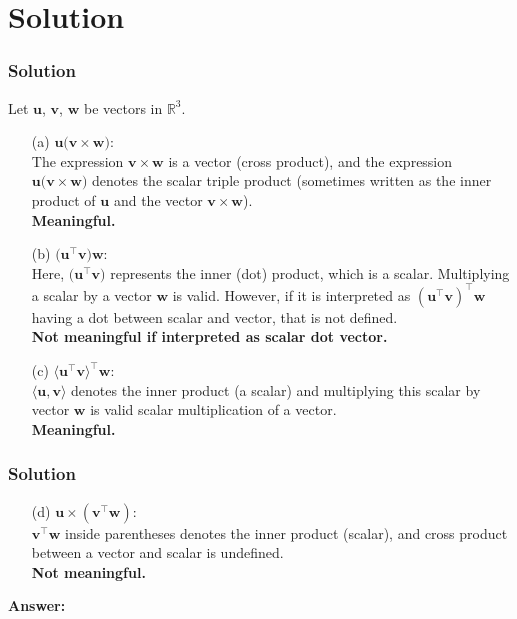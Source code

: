 \documentclass{beamer}
\theoremstyle{remark}
\numberwithin{equation}{section}
\begin{document}
\section{Solution}
\begin{frame}[fragile]
    \frametitle{Solution}
Let $\mathbf{u}$, $\mathbf{v}$, $\mathbf{w}$ be vectors in $\mathbb{R}^3$.

\begin{itemize}
    \item[(a)] $\mathbf{u} \big(\mathbf{v} \times \mathbf{w}\big)$: \\
    The expression $\mathbf{v} \times \mathbf{w}$ is a vector (cross product), and the expression $\mathbf{u} \big(\mathbf{v} \times \mathbf{w}\big)$ denotes the scalar triple product (sometimes written as the inner product of $\mathbf{u}$ and the vector $\mathbf{v} \times \mathbf{w}$).\\
    \textbf{Meaningful.}
    
    \item[(b)] $\big(\mathbf{u} ^\top\mathbf{v}\big) \mathbf{w}$: \\
    Here, $\big(\mathbf{u}^\top \mathbf{v}\big)$ represents the inner (dot) product, which is a scalar. Multiplying a scalar by a vector $\mathbf{w}$ is valid. However, if it is interpreted as $(\mathbf{u}^\top  \mathbf{v}) ^\top \mathbf{w}$ having a dot between scalar and vector, that is not defined.\\
    \textbf{Not meaningful if interpreted as scalar dot vector.}
    
    \item[(c)] $\langle \mathbf{u}^\top  \mathbf{v} \rangle^\top  \mathbf{w}$: \\
    $\langle \mathbf{u}, \mathbf{v} \rangle$ denotes the inner product (a scalar) and multiplying this scalar by vector $\mathbf{w}$ is valid scalar multiplication of a vector.\\
    \textbf{Meaningful.} 
    
\end{itemize}



\end{frame}
\begin{frame}[fragile]
    \frametitle{Solution}
\begin{itemize}
    
    \item[(d)] $\mathbf{u} \times (\mathbf{v}^\top  \mathbf{w})$: \\
    $\mathbf{v}^\top \mathbf{w}$ inside parentheses denotes the inner product (scalar), and cross product between a vector and scalar is undefined.\\
    \textbf{Not meaningful.}
\end{itemize}

\textbf{Answer:}


\end{frame}
\end{document}
